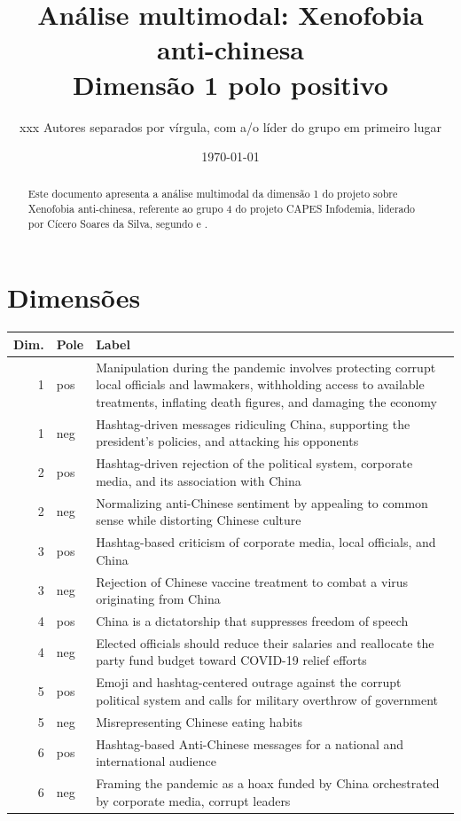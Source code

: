 \documentclass[aspectratio=169]{article}
\title{Análise multimodal: Xenofobia anti-chinesa\\Dimensão 1 polo positivo}
\author{xxx Autores separados por vírgula, com a/o líder do grupo em primeiro lugar}
\date{\today}
\begin{document}
\maketitle

\begin{abstract}
Este documento apresenta a análise multimodal da dimensão 1 do projeto sobre Xenofobia anti-chinesa, referente ao grupo 4 do projeto CAPES Infodemia, liderado por Cícero Soares da Silva, segundo  e .
\end{abstract}

\section{Dimensões}

\begin{table}[H]
\begin{tabular}{r l  p{}} \hline
Dim.&Pole& Label \\ \hline
1&pos&Manipulation during the pandemic involves protecting corrupt local officials and lawmakers, withholding access to available treatments, inflating death figures, and damaging the economy \\
1&neg&Hashtag-driven messages ridiculing China, supporting the president's policies, and attacking his opponents \\ \hline
2&pos&Hashtag-driven rejection of the political system, corporate media, and its association with China \\
2&neg&Normalizing anti-Chinese sentiment by appealing to common sense while distorting Chinese culture \\  \hline
3&pos&Hashtag-based criticism of corporate media, local officials, and China \\
3&neg&Rejection of Chinese vaccine treatment to combat a virus originating from China \\  \hline
4&pos&China is a dictatorship that suppresses freedom of speech  \\
4&neg&Elected officials should reduce their salaries and reallocate the party fund budget toward COVID-19 relief efforts \\  \hline
5&pos&Emoji and hashtag-centered outrage against the corrupt political system and calls for military overthrow of government  \\
5&neg&Misrepresenting Chinese eating habits \\  \hline
6&pos&Hashtag-based Anti-Chinese messages for a national and international audience  \\
6&neg&Framing the pandemic as a hoax funded by China orchestrated by corporate media, corrupt leaders \\
\hline
\end{tabular}
\end{table}
\end{document}
